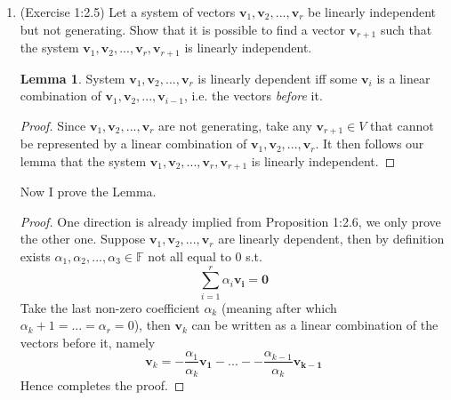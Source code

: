 \documentclass[]{book}
\theoremstyle{definition}
\newtheorem*{lem*}{Lemma}
\newcommand{\0}{\mathbf{0}}
\begin{document}
\begin{enumerate}
\item (Exercise 1:2.5)
Let a system of vectors $\mathbf{v}_1,\mathbf{v}_2,...,\mathbf{v}_r$ be linearly independent but not generating. Show that it is possible to find a vector $\mathbf{v}_{r+1}$ such that the system $\mathbf{v}_1,\mathbf{v}_2,...,\mathbf{v}_r,\mathbf{v}_{r+1}$ is linearly independent.
\begin{lem*}
System $\mathbf{v}_1,\mathbf{v}_2,...,\mathbf{v}_r$ is linearly dependent iff some $\mathbf{v}_i$ is a linear combination of $\mathbf{v}_1,\mathbf{v}_2,...,\mathbf{v}_{i-1}$, i.e. the vectors \emph{before} it.
\end{lem*}
\begin{proof}
Since $\mathbf{v}_1,\mathbf{v}_2,...,\mathbf{v}_r$ are not generating, take any $\mathbf{v}_{r+1}\in V$ that cannot be represented by a linear combination of $\mathbf{v}_1,\mathbf{v}_2,...,\mathbf{v}_r$. It then follows our lemma that the system $\mathbf{v}_1,\mathbf{v}_2,...,\mathbf{v}_r,\mathbf{v}_{r+1}$ is linearly independent.
\end{proof}
Now I prove the Lemma.
\begin{proof}
One direction is already implied from Proposition 1:2.6, we only prove the other one.\newline
Suppose $\mathbf{v}_1,\mathbf{v}_2,...,\mathbf{v}_r$ are linearly dependent, then by definition exists $\alpha_1,\alpha_2,...,\alpha_3\in \mathbb{F}$ not all equal to 0 s.t.
\[
\sum_{i=1}^{r}\alpha_i\mathbf{v_i}=\0
\]
Take the last non-zero coefficient $\alpha_k$ (meaning after which $\alpha_k+1=...=\alpha_r=0$), then $\mathbf{v}_k$ can be written as a linear combination of the vectors before it, namely
\[
\mathbf{v}_k=-\frac{\alpha_1}{\alpha_k}\mathbf{v_1}-...--\frac{\alpha_{k-1}}{\alpha_k}\mathbf{v_{k-1}}
\]
Hence completes the proof.
\end{proof}


\end{enumerate}
\end{document}
